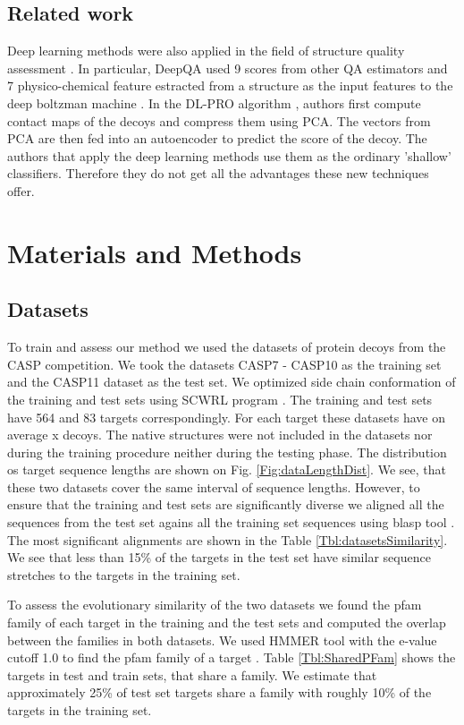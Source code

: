\documentclass[a4paper,10pt]{article}
\begin{document}
\subsection{Related work}
Deep learning methods were also applied in the field of structure quality assessment \cite{}. In particular, 
DeepQA \cite{} used 9 scores from other QA estimators and 
7 physico-chemical feature estracted from a structure as the input features to the deep boltzman machine \cite{}. 
In the DL-PRO algorithm \cite{}, authors first compute contact maps of the decoys and compress them using PCA. 
The vectors from PCA are then fed into an autoencoder to predict the score of the decoy. 
The authors that apply the deep learning methods use them as the ordinary 'shallow' classifiers. 
Therefore they do not get all the advantages these new techniques offer.


\section{Materials and Methods}




\subsection{Datasets}
To train and assess our method we used the datasets of protein decoys from the CASP competition. 
We took the datasets CASP7 - CASP10 as the training set and the CASP11 dataset as the test set.
We optimized side chain conformation of the training and test sets using SCWRL program \cite{}.
The training and test sets have 564 and 83 targets correspondingly. For each target these datasets have 
on average x decoys. The native structures were not included in the datasets nor during the training procedure
neither during the testing phase. The distribution os target sequence lengths are shown on Fig. \ref{Fig:dataLengthDist}. We see,
that these two datasets cover the same interval of sequence lengths. However, to ensure that the training 
and test sets are significantly diverse we aligned all the sequences from the test set agains all the training 
set sequences using blasp tool \cite{}. The most significant alignments are shown in the Table \ref{Tbl:datasetsSimilarity}.
We see that less than 15\% of the targets in the test set have similar sequence stretches to the targets in the training set.

To assess the evolutionary similarity of the two datasets we found the pfam family of each target in the training and the 
test sets and computed the overlap between the families in both datasets. We used HMMER tool with the e-value cutoff 1.0 to 
find the pfam family of a target \cite{}. Table \ref{Tbl:SharedPFam} shows the targets in test and train sets, that share a family. We 
estimate that approximately 25\% of test set targets share a family with roughly 10\% of the targets in the training set.
\end{document}
